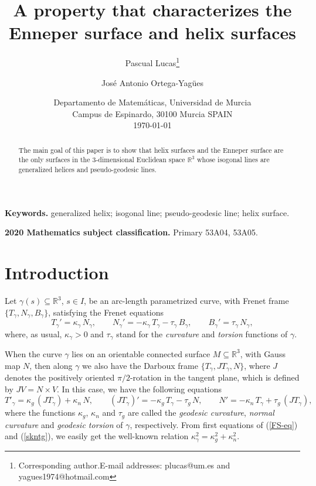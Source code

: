 \documentclass[11pt,a4paper]{article}
\title{A property that characterizes the Enneper surface and helix surfaces}
\author{\normalsize Pascual Lucas\footnote{Corresponding author.\newline \hspace*{17pt}E-mail
addresses: plucas@um.es and yagues1974@hotmail.com}\and\normalsize
José Antonio Ortega-Yagües}
\date{\normalsize Departamento de Matemáticas, Universidad de Murcia\\
       Campus de Espinardo, 30100 Murcia SPAIN\\[10mm] \today}
\def\R#1{\ensuremath{\mathbb{R}^{#1}}}
\def\g{\gamma}
\begin{document}
\maketitle

\begin{abstract}
The main goal of this paper is to show that helix surfaces and the Enneper surface are the only surfaces in the 3-dimensional Euclidean space $\R3$ whose isogonal lines are generalized helices and pseudo-geodesic lines.
\end{abstract}
\medskip

\noindent\textbf{Keywords.} generalized helix; isogonal line; pseudo-geodesic line; helix surface.

\noindent\textbf{2020 Mathematics subject classification.} Primary 53A04, 53A05.

\section{Introduction}
\label{s:intro}

Let $\gamma(s)\subseteq\R3$, $s\in I$, be an arc-length parametrized curve, with Frenet frame $\{T_\g,N_\g,B_\g\}$, satisfying the Frenet equations
\begin{equation}\label{FS-eq}
T_\gamma' = \kappa_\gamma\,N_\gamma,\qquad
N_\gamma'= -\kappa_\gamma\,T_\gamma-\tau_\gamma\,B_\gamma,\qquad
B_\gamma' = \tau_\gamma\,N_\gamma,
\end{equation}
where, as usual, $\kappa_\g>0$ and $\tau_\g$ stand for the \emph{curvature} and \emph{torsion} functions of $\g$.

When the curve $\gamma$ lies on an orientable connected surface $M\subseteq\R3$, with Gauss map $N$, then along $\gamma$ we also have the Darboux frame $\{T_\gamma,JT_\gamma,N\}$, where $J$ denotes the positively oriented $\pi/2$-rotation in the tangent plane, which is defined by $JV=N\times V$. In this case, we have the following equations %
\begin{equation}\label{skntg}
T'_\gamma= \kappa_g\,(JT_\gamma)+\kappa_n\,N,\qquad
(JT_\gamma)' = -\kappa_g\,T_\gamma -\tau_g\,N,\qquad
N' = -\kappa_n\,T_\gamma +\tau_g\,(JT_\gamma),
\end{equation}
where the functions $\kappa_g$, $\kappa_n$ and $\tau_g$ are called the \emph{geodesic curvature}, \emph{normal curvature} and \emph{geodesic torsion} of $\g$, respectively. From first equations of (\ref{FS-eq}) and (\ref{skntg}), we easily get the well-known relation $\kappa_\gamma^2 =\kappa^2_g+\kappa^2_n$.
\end{document}
